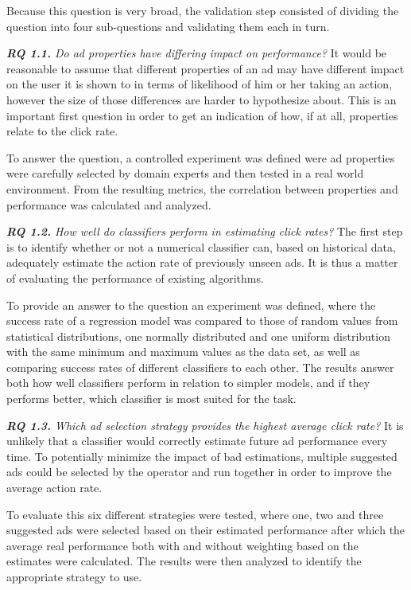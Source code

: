 \documentclass{sig-alternate}
\begin{document}
Because this question is very broad, the validation step consisted of dividing the question into four sub-questions and validating them each in turn.

\textit{\textbf{RQ 1.1.} Do ad properties have differing impact on performance?}
It would be reasonable to assume that different properties of an ad may have different impact on the user it is shown to in terms of likelihood of him or her taking an action, however the size of those differences are harder to hypothesize about. This is an important first question in order to get an indication of how, if at all, properties relate to the click rate.

To answer the question, a controlled experiment was defined were ad properties were carefully selected by domain experts and then tested in a real world environment. From the resulting metrics, the correlation between properties and performance was calculated and analyzed.

\textit{\textbf{RQ 1.2.} How well do classifiers perform in estimating click rates?}
The first step is to identify whether or not a numerical classifier can, based on historical data, adequately estimate the action rate of previously unseen ads. It is thus a matter of evaluating the performance of existing algorithms.

To provide an answer to the question an experiment was defined, where the success rate of a regression model was compared to those of random values from statistical distributions, one normally distributed and one uniform distribution with the same minimum and maximum values as the data set, as well as comparing success rates of different classifiers to each other. The results answer both how well classifiers perform in relation to simpler models, and if they performs better, which classifier is most suited for the task.

\textit{\textbf{RQ 1.3.} Which ad selection strategy provides the highest average click rate?}
It is unlikely that a classifier would correctly estimate future ad performance every time. To potentially minimize the impact of bad estimations, multiple suggested ads could be selected by the operator and run together in order to improve the average action rate.

To evaluate this six different strategies were tested, where one, two and three suggested ads were selected based on their estimated performance after which the average real performance both with and without weighting based on the estimates were calculated. The results were then analyzed to identify the appropriate strategy to use.
\end{document}

